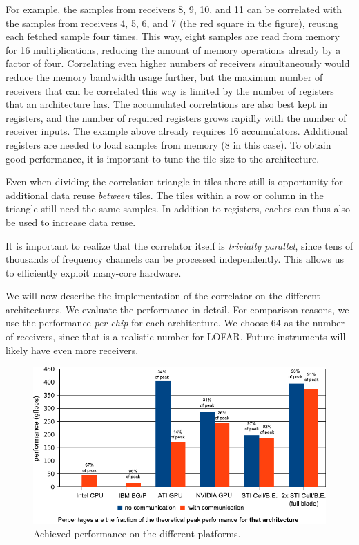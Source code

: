 \documentclass{article}
\begin{document}
For example, the samples from receivers 8, 9, 10, and 11 can be correlated
with the samples from receivers 4, 5, 6, and 7 (the red square in the figure),
reusing each fetched sample four times.
This way, eight samples are read from memory for 16
multiplications, reducing the amount of memory operations already by a factor
of four.
Correlating even higher numbers of receivers simultaneously would reduce the
memory bandwidth usage further, but the maximum number of receivers that can
be correlated this way is limited by the number of registers that an architecture has.
The accumulated correlations are also best kept in registers, and the number of
required registers grows rapidly with the number of receiver inputs.
The example above already requires 16 accumulators.
Additional registers are needed to load samples from memory (8 in this case).
To obtain good performance, it is important to tune the tile size to the
architecture.


Even when dividing the correlation triangle in tiles there still is
opportunity for additional data reuse \emph{between} tiles.  The tiles
within a row or column in the triangle still need the same samples.
In addition to registers, caches can thus also be used to increase
data reuse. 

It is important to realize that the
correlator itself is \emph{trivially parallel}, since tens of thousands of
frequency channels can be processed independently.  This allows us to
efficiently exploit many-core hardware.

We will now describe the implementation of the correlator on
the different architectures. 
We evaluate the performance in detail. For comparison reasons, we use the performance
\emph{per chip} for each architecture.
We choose 64 as the number of receivers, since
that is a realistic number for LOFAR.  Future instruments will likely
have even more receivers. 

\begin{figure}[t]
\begin{center}
\includegraphics[width=12cm]{figures/performance-graph-v2.pdf}
\end{center}
\vspace{-0.5cm}
\caption{Achieved performance on the different platforms.}
\label{performance-graph}
\end{figure}
\end{document}
